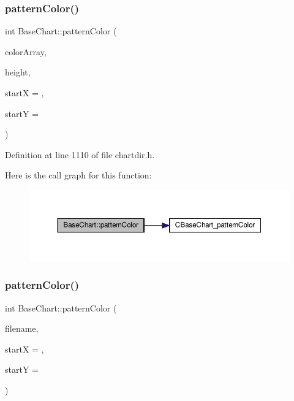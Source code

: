 \subsubsection{\texorpdfstring{pattern\+Color()}{patternColor()}\hspace{0.1cm}{\footnotesize\ttfamily [2/3]}}
{\footnotesize\ttfamily int Base\+Chart\+::pattern\+Color (\begin{DoxyParamCaption}\item[{\hyperlink{class_int_array}{Int\+Array}}]{color\+Array,  }\item[{int}]{height,  }\item[{int}]{startX = {},  }\item[{int}]{startY = {} }\end{DoxyParamCaption})\hspace{0.3cm}{\ttfamily [inline]}}



Definition at line 1110 of file chartdir.\+h.

Here is the call graph for this function\+:
\nopagebreak
\begin{figure}[H]
\begin{center}
\leavevmode
\includegraphics[width=350pt]{class_base_chart_a6b6bea43b51896c82d83778a614f5d99_cgraph}
\end{center}
\end{figure}
\mbox{\label{class_base_chart_a5938beff89dc799bdfd12663caa65aff}} 
\subsubsection{\texorpdfstring{pattern\+Color()}{patternColor()}\hspace{0.1cm}{\footnotesize\ttfamily [3/3]}}
{\footnotesize\ttfamily int Base\+Chart\+::pattern\+Color (\begin{DoxyParamCaption}\item[{const char $\ast$}]{filename,  }\item[{int}]{startX = {},  }\item[{int}]{startY = {} }\end{DoxyParamCaption})\hspace{0.3cm}{\ttfamily [inline]}}



